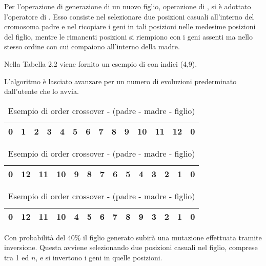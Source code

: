 Per l'operazione di generazione di un nuovo figlio, operazione di , si è adottato l'operatore di . Esso consiste nel selezionare due posizioni casuali all'interno del cromosoma padre e nel ricopiare i geni in tali posizioni nelle medesime posizioni del figlio, mentre le rimanenti posizioni si riempiono con i geni assenti ma nello stesso ordine con cui compaiono all'interno della madre.

Nella Tabella 2.2 viene fornito un esempio di  con indici (4,9).

L'algoritmo è lasciato avanzare per un numero di evoluzioni prederminato dall'utente che lo avvia.

\begin{table}
\centering
\begin{tabular}{|c|c|c|c|c|c|c|c|c|c|c|c|c|c|}
\hline 
0 &  1 &  2 &  3 & 4 & 5 & 6 & 7 & 8 & 9 & 10 & 11 & 12 & 0\\
\hline
\end{tabular}
\begin{tabular}{|c|c|c|c|c|c|c|c|c|c|c|c|c|c|}
\hline
0 & 12 & 11 & 10 & 9 & 8 & 7 & 6 & 5 & 4 &  3 &  2 &  1 & 0\\
\hline
\end{tabular}
\begin{tabular}{|c|c|c|c|c|c|c|c|c|c|c|c|c|c|}
\hline
0 & 12 & 11 & 10 & 4 & 5 & 6 & 7 & 8 & 9 &  3 &  2 &  1 & 0\\
\hline
\end{tabular}
\caption{Esempio di order crossover - (padre - madre - figlio)}
\end{table}

Con probabilità del 40\% il figlio generato subirà una mutazione effettuata tramite inversione. Questa avviene selezionando due posizioni casuali nel figlio, comprese tra 1 ed $n$, e si invertono i geni in quelle posizioni.